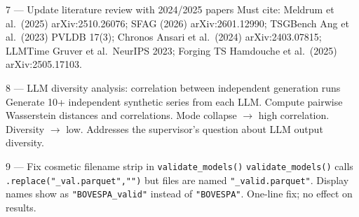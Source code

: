 \documentclass[10pt]{article}
\begin{document}
%
  {7 --- Update literature review with 2024/2025 papers}%
  {Must cite: Meldrum et al.\ (2025) arXiv:2510.26076; SFAG (2026) arXiv:2601.12990; TSGBench Ang et al.\ (2023) PVLDB 17(3); Chronos Ansari et al.\ (2024) arXiv:2403.07815; LLMTime Gruver et al.\ NeurIPS 2023; Forging TS Hamdouche et al.\ (2025) arXiv:2505.17103.}

%
  {8 --- LLM diversity analysis: correlation between independent generation runs}%
  {Generate 10+ independent synthetic series from each LLM. Compute pairwise Wasserstein distances and correlations. Mode collapse $\to$ high correlation. Diversity $\to$ low. Addresses the supervisor's question about LLM output diversity.}

%
  {9 --- Fix cosmetic filename strip in \texttt{validate\_models()}}%
  {\texttt{validate\_models()} calls \texttt{.replace("\_val.parquet","")} but files are named \texttt{"\_valid.parquet"}. Display names show as \texttt{"BOVESPA\_valid"} instead of \texttt{"BOVESPA"}. One-line fix; no effect on results.}
\end{document}
